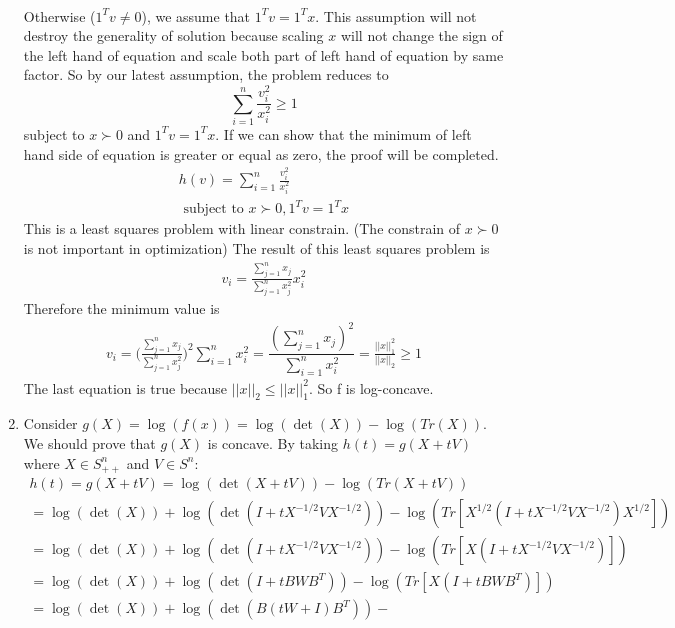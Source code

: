 \begin{latin}
\begin{enumerate}
	\\
	Otherwise ($ 1^{T} v \neq 0 $), we assume that $ 1^{T} v = 1^{T} x $. This assumption will not destroy the generality of solution because scaling $ x $ will not change the sign of the left hand of equation and scale both part of left hand of equation by same factor. So by our latest assumption, the problem reduces to 
	\begin{equation*}
		 \sum_{i=1}^{n} \frac{v_{i}^{2}}{x_{i}^{2}} \geq 1 
	\end{equation*}
	 subject to $ x \succ 0 $ and $ 1^{T} v = 1^{T} x $. If we can show that the minimum of left hand side of equation is greater or equal as zero, the proof will be completed.
	 \begin{gather*}
	 	h(v) = \sum_{i=1}^{n} \frac{v_{i}^{2}}{x_{i}^{2}}
	 	\\
	 	\text{ subject to } x \succ 0 , 1^{T} v = 1^{T} x
	 \end{gather*}
 	This is a least squares problem with linear constrain. (The constrain of $ x \succ 0 $ is not important in optimization) The result of this least squares problem is 
 	\begin{gather*}
 		v_{i} = \frac{\sum_{j=1}^{n} x_{j}}{\sum_{j=1}^{n} x^{2}_{j}} x^{2}_{i}
 	\end{gather*}
 	Therefore the minimum value is 
 	\begin{gather*}
 		v_{i} = \bigg(\frac{\sum_{j=1}^{n} x_{j}}{\sum_{j=1}^{n} x^{2}_{j}}\bigg)^{2} \sum_{i=1}^{n}x^{2}_{i} = \dfrac{(\sum_{j=1}^{n} x_{j})^{2}}{\sum_{i=1}^{n}x^{2}_{i}} = \frac{||x||_{1}^{2}}{||x||_{2}}\geq 1
 	\end{gather*}
 	The last equation is true because $ ||x||_{2} \leq ||x||_{1}^{2} $. So f is log-concave.
	\item Consider $ g(X) = \log (f(x)) = \log(\det(X)) - \log(Tr(X))$. We should prove that $ g(X) $ is concave. By taking $ h(t) = g(X+tV)$ where $ X \in S^{n}_{++} $ and $ V \in S^{n} $:
	\begin{gather*}
		h(t) = g(X+tV) = \log(\det(X+tV)) - \log(Tr(X+tV)) 
		\\
		= \log(\det(X)) + \log(\det(I+tX^{-1/2}VX^{-1/2})) - \log(Tr[X^{1/2}(I+tX^{-1/2}VX^{-1/2})X^{1/2}]) 
		\\
		= \log(\det(X)) + \log(\det(I+tX^{-1/2}VX^{-1/2})) - \log(Tr[X(I+tX^{-1/2}VX^{-1/2})]) 
		\\
		= \log(\det(X)) + \log(\det(I+tB W B^{T})) -
		\log(Tr[X(I+tB W B^{T})]) 
		\\
		= \log(\det(X)) + \log(\det(B (tW+I) B^{T})) -

\end{gather*}
\end{enumerate}
\end{latin}
